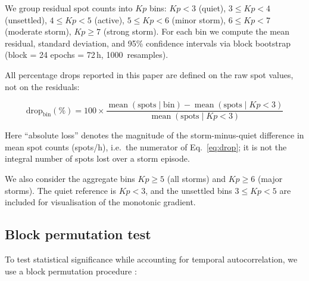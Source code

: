 \documentclass{agujournal2019}
\begin{document}
We group residual spot counts into $Kp$ bins: $Kp < 3$ (quiet),
$3 \le Kp < 4$ (unsettled), $4 \le Kp < 5$ (active),
$5 \le Kp < 6$ (minor storm), $6 \le Kp < 7$ (moderate storm),
$Kp \ge 7$ (strong storm). For each bin we compute the mean residual,
standard deviation, and 95\% confidence intervals via block bootstrap \citep{efron1993}
(block = 24 epochs = 72\,h, \SI{1000}{resamples}).

All percentage drops reported in this paper are defined on the raw
spot values, not on the residuals:

\begin{equation}
	\text{drop}_{\text{bin}}(\%) = 100 \times
	\frac{\operatorname{mean}(\text{spots} \mid \text{bin}) -
	\operatorname{mean}(\text{spots} \mid Kp < 3)}
	{\operatorname{mean}(\text{spots} \mid Kp < 3)}
	\label{eq:drop}
\end{equation}

Here ``absolute loss'' denotes the magnitude of the storm-minus-quiet
difference in mean spot counts (spots/h), i.e.\ the numerator of
Eq.~\eqref{eq:drop}; it is not the integral number of spots lost over a
storm episode.


We also consider the aggregate bins $Kp \ge 5$ (all storms) and
$Kp \ge 6$ (major storms). The quiet reference is $Kp < 3$, and the
unsettled bins $3 \le Kp < 5$ are included for visualisation of the
monotonic gradient.

\subsection{Block permutation test}

To test statistical significance while accounting for temporal
autocorrelation, we use a block permutation procedure
\citep{davison1997}:
\end{document}
